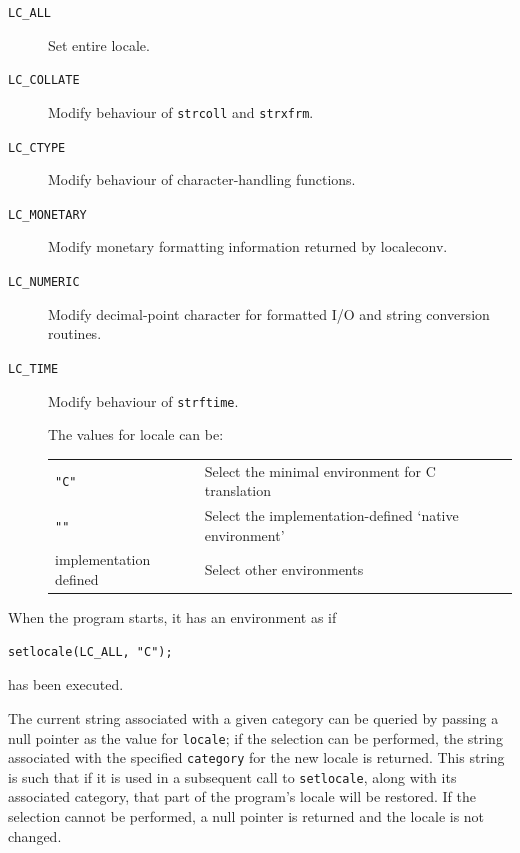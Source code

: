    \begin{description}
   \item[\texttt{LC\_ALL}]
     Set entire locale.
   \item[\texttt{LC\_COLLATE}]
     Modify behaviour of \texttt{strcoll} and \texttt{strxfrm}.
   \item[\texttt{LC\_CTYPE}]
     Modify behaviour of character-handling functions.
   \item[\texttt{LC\_MONETARY}]
     Modify  monetary  formatting  information returned by localeconv.
   \item[\texttt{LC\_NUMERIC}]
     Modify decimal-point character for formatted I/O
     and string conversion routines.
    \item[\texttt{LC\_TIME}] 
     Modify behaviour of \texttt{strftime}.

     The values for locale can be:

     \begin{tabular}{lp{}}
        \toprule
       \texttt{"C"} & Select the minimal environment for C translation      \\
       \texttt{""} & Select the implementation-defined `native environment' \\
       implementation defined & Select other environments      \\
       \bottomrule
     \end{tabular}


      \end{description}

   When the program starts, it has an environment as if


   \begin{Verbatim}
setlocale(LC_ALL, "C");
\end{Verbatim}

   has been executed.


   The current string associated with a given category  can  be
    queried  by  passing a null pointer as the value for \texttt{locale};
    if the selection can be  performed,  the  string  associated
    with  the specified \texttt{category} for the new locale is returned.
    This string is such that if it is used in a subsequent  call to
    \texttt{setlocale}, along with its associated category, that part
    of the program's locale will be restored.  If the  selection
    cannot  be  performed,  a  null  pointer is returned and the
    locale is not changed.



